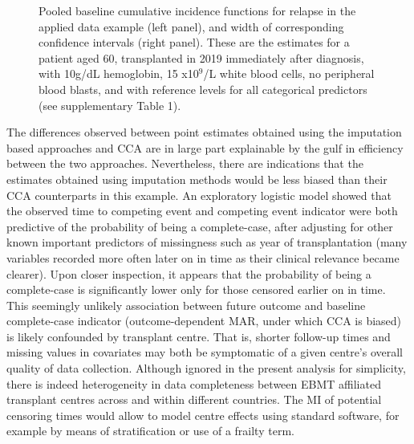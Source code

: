 \documentclass[
  letterpaper,
  DIV=11,
  numbers=noendperiod]{scrreprt}
\begin{document}
\begin{figure}


\caption{\label{fig-applied-base-cuminc}Pooled baseline cumulative
incidence functions for relapse in the applied data example (left
panel), and width of corresponding confidence intervals (right panel).
These are the estimates for a patient aged 60, transplanted in 2019
immediately after diagnosis, with 10g/dL hemoglobin, 15 x10\(^9\)/L
white blood cells, no peripheral blood blasts, and with reference levels
for all categorical predictors (see supplementary Table 1).}

\end{figure}%

The differences observed between point estimates obtained using the
imputation based approaches and CCA are in large part explainable by the
gulf in efficiency between the two approaches. Nevertheless, there are
indications that the estimates obtained using imputation methods would
be less biased than their CCA counterparts in this example. An
exploratory logistic model showed that the observed time to competing
event and competing event indicator were both predictive of the
probability of being a complete-case, after adjusting for other known
important predictors of missingness such as year of transplantation
(many variables recorded more often later on in time as their clinical
relevance became clearer). Upon closer inspection, it appears that the
probability of being a complete-case is significantly lower only for
those censored earlier on in time. This seemingly unlikely association
between future outcome and baseline complete-case indicator
(outcome-dependent MAR, under which CCA is biased) is likely confounded
by transplant centre. That is, shorter follow-up times and missing
values in covariates may both be symptomatic of a given centre's overall
quality of data collection. Although ignored in the present analysis for
simplicity, there is indeed heterogeneity in data completeness between
EBMT affiliated transplant centres across and within different
countries. The MI of potential censoring times would allow to model
centre effects using standard software, for example by means of
stratification or use of a frailty term.
\end{document}
